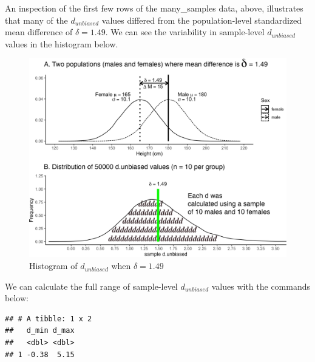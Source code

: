 \documentclass[
]{krantz}
\makeatletter
\newenvironment{Shaded}{\begin{snugshade}}{\end{snugshade}}
\newcommand{\DataTypeTok}[1]{\textcolor[rgb]{0.27,0.27,0.27}{#1}}
\newcommand{\KeywordTok}[1]{\textcolor[rgb]{0.27,0.27,0.27}{\textbf{#1}}}
\newcommand{\NormalTok}[1]{#1}
\newcommand{\OperatorTok}[1]{\textcolor[rgb]{0.43,0.43,0.43}{\textbf{#1}}}
\newcommand{\StringTok}[1]{\textcolor[rgb]{0.5,0.5,0.5}{#1}}
\newenvironment{kframe}{%
\medskip{}
\setlength{\fboxsep}{.8em}
 \def\at@end@of@kframe{}%
 \ifinner\ifhmode%
  \def\at@end@of@kframe{\end{minipage}}%
  \begin{minipage}{\columnwidth}%
 \fi\fi%
 \def\FrameCommand##1{\hskip\@totalleftmargin \hskip-\fboxsep
 \colorbox{shadecolor}{##1}\hskip-\fboxsep
     \hskip-\linewidth \hskip-\@totalleftmargin \hskip\columnwidth}%
 \MakeFramed {\advance\hsize-\width
   \@totalleftmargin\z@ \linewidth\hsize
   \@setminipage}}%
 {\par\unskip\endMakeFramed%
 \at@end@of@kframe}
\renewenvironment{Shaded}{\begin{kframe}}{\end{kframe}}
\makeatother
\begin{document}
An inspection of the first few rows of the many\_samples data, above, illustrates that many of the \(d_{unbiased}\) values differed from the population-level standardized mean difference of \(\delta = 1.49\). We can see the variability in sample-level \(d_{unbiased}\) values in the histogram below.

\begin{figure}
\includegraphics[width=0.95\linewidth]{ch_samples/images/d_dist} \caption{Histogram of $d_{unbiased}$ when $\delta = 1.49$}\label{fig:ddist}
\end{figure}

We can calculate the full range of sample-level \(d_{unbiased}\) values with the commands below:

\begin{Shaded}
\end{Shaded}

\begin{verbatim}
## # A tibble: 1 x 2
##   d_min d_max
##   <dbl> <dbl>
## 1 -0.38  5.15
\end{verbatim}
\end{document}
